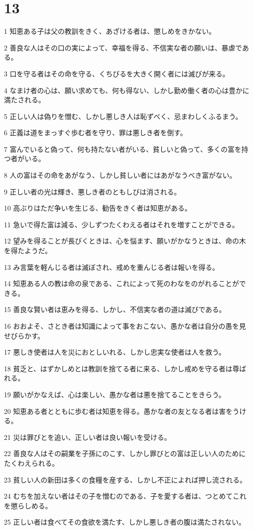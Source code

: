 \chapter{13}

\par 1 知恵ある子は父の教訓をきく、あざける者は、懲しめをきかない。
\par 2 善良な人はその口の実によって、幸福を得る、不信実な者の願いは、暴虐である。
\par 3 口を守る者はその命を守る、くちびるを大きく開く者には滅びが来る。
\par 4 なまけ者の心は、願い求めても、何も得ない、しかし勤め働く者の心は豊かに満たされる。
\par 5 正しい人は偽りを憎む、しかし悪しき人は恥ずべく、忌まわしくふるまう。
\par 6 正義は道をまっすぐ歩む者を守り、罪は悪しき者を倒す。
\par 7 富んでいると偽って、何も持たない者がいる、貧しいと偽って、多くの富を持つ者がいる。
\par 8 人の富はその命をあがなう、しかし貧しい者にはあがなうべき富がない。
\par 9 正しい者の光は輝き、悪しき者のともしびは消される。
\par 10 高ぶりはただ争いを生じる、勧告をきく者は知恵がある。
\par 11 急いで得た富は減る、少しずつたくわえる者はそれを増すことができる。
\par 12 望みを得ることが長びくときは、心を悩ます、願いがかなうときは、命の木を得たようだ。
\par 13 み言葉を軽んじる者は滅ぼされ、戒めを重んじる者は報いを得る。
\par 14 知恵ある人の教は命の泉である、これによって死のわなをのがれることができる。
\par 15 善良な賢い者は恵みを得る、しかし、不信実な者の道は滅びである。
\par 16 おおよそ、さとき者は知識によって事をおこない、愚かな者は自分の愚を見せびらかす。
\par 17 悪しき使者は人を災におとしいれる、しかし忠実な使者は人を救う。
\par 18 貧乏と、はずかしめとは教訓を捨てる者に来る、しかし戒めを守る者は尊ばれる。
\par 19 願いがかなえば、心は楽しい、愚かな者は悪を捨てることをきらう。
\par 20 知恵ある者とともに歩む者は知恵を得る。愚かな者の友となる者は害をうける。
\par 21 災は罪びとを追い、正しい者は良い報いを受ける。
\par 22 善良な人はその嗣業を子孫にのこす、しかし罪びとの富は正しい人のためにたくわえられる。
\par 23 貧しい人の新田は多くの食糧を産する、しかし不正によれば押し流される。
\par 24 むちを加えない者はその子を憎むのである、子を愛する者は、つとめてこれを懲らしめる。
\par 25 正しい者は食べてその食欲を満たす、しかし悪しき者の腹は満たされない。

